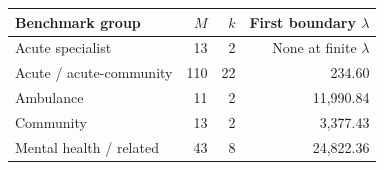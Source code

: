 \begin{tabular}{lrrr}
\toprule
Benchmark group & $M$ & $k$ & First boundary $\lambda$ \\
\midrule
Acute specialist & 13 & 2 & None at finite $\lambda$ \\
Acute / acute-community & 110 & 22 & 234.60 \\
Ambulance & 11 & 2 & 11,990.84 \\
Community & 13 & 2 & 3,377.43 \\
Mental health / related & 43 & 8 & 24,822.36 \\
\bottomrule
\end{tabular}

